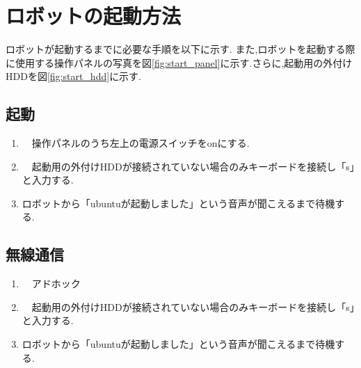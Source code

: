 \section{ロボットの起動方法}
ロボットが起動するまでに必要な手順を以下に示す.
また,ロボットを起動する際に使用する操作パネルの写真を図\ref{fig:start_panel}に示す.さらに,起動用の外付けHDDを図\ref{fig:start_hdd}に示す.
\subsection{起動}
\begin{enumerate}
\item　操作パネルのうち左上の電源スイッチをonにする.
\item　起動用の外付けHDDが接続されていない場合のみキーボードを接続し「s」と入力する.
\item ロボットから「ubuntuが起動しました」という音声が聞こえるまで待機する.
\end{enumerate}
\subsection{無線通信}
\begin{enumerate}
\item　アドホック
\item　起動用の外付けHDDが接続されていない場合のみキーボードを接続し「s」と入力する.
\item ロボットから「ubuntuが起動しました」という音声が聞こえるまで待機する.
\end{enumerate}
